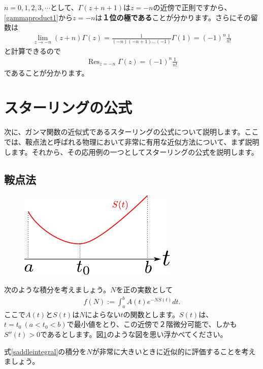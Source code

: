 \documentclass[report,paper=a4, fontsize=12pt, line_length=16cm, number_of_lines=33,dvipdfmx]{jlreq}
\numberwithin{equation}{section}
\newcommand{\strong}[1]{\textsf{\bfseries #1}}
\DeclareMathOperator*{\Resi}{\mathrm{Res}}
\begin{document}
$n=0,1,2,3,\cdots$として、$\Gamma(z+n+1)$は$z=-n$の近傍で正則ですから、\eqref{gammaproduct1}から$z=-n$は\strong{１位の極である}ことが分かります。さらにその留数は
\begin{align}
  \lim_{z\to -n}(z+n)\Gamma(z)=\frac{1}{(-n)(-n+1)\dots(-1)}\Gamma(1)
  =(-1)^n \frac{1}{n!}
\end{align}
と計算できるので
\begin{align}
  \Resi_{z=-n}\Gamma(z)=(-1)^n \frac{1}{n!}
\end{align}
であることが分かります。

\section{スターリングの公式}
次に、ガンマ関数の近似式であるスターリングの公式について説明します。ここでは、鞍点法と呼ばれる物理において非常に有用な近似方法について、まず説明します。それから、その応用例の一つとしてスターリングの公式を説明します。

\subsection{鞍点法}

\begin{figure}[htbp]
  \centering
  \includegraphics{saddlefunction.pdf}
  \caption{}
  \label{fig:saddlefunction}
\end{figure}
次のような積分を考えましょう。$N$を正の実数として
\begin{align}
  f(N):=\int_{a}^{b}A(t)e^{-N S(t)}dt.\label{saddleintegral}
\end{align}
ここで$A(t)$と$S(t)$は$N$によらない$t$の関数とします。$S(t)$は、$t=t_0\ (a<t_0<b)$で最小値をとり、この近傍で２階微分可能で、しかも$S''(t)>0$であるとします。図\ref{fig:saddlefunction}のような図を思い浮かべてください。

式\eqref{saddleintegral}の積分を$N$が非常に大きいときに近似的に評価することを考えましょう。
\end{document}
